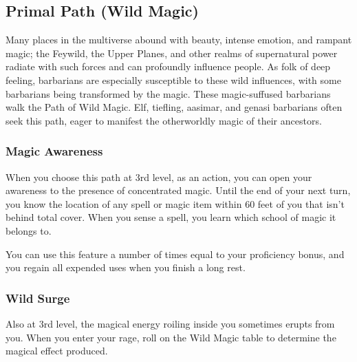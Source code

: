 {\subsection*{Primal Path (Wild Magic)}
Many places in the multiverse abound with beauty, intense emotion, and rampant magic; the Feywild, the Upper Planes, and other realms of supernatural power radiate with such forces and can profoundly influence people. As folk of deep feeling, barbarians are especially susceptible to these wild influences, with some barbarians being transformed by the magic. These magic-suffused barbarians walk the Path of Wild Magic. Elf, tiefling, aasimar, and genasi barbarians often seek this path, eager to manifest the otherworldly magic of their ancestors.
\subsubsection*{Magic Awareness}
When you choose this path at 3rd level, as an action, you can open your awareness to the presence of concentrated magic. Until the end of your next turn, you know the location of any spell or magic item within 60 feet of you that isn’t behind total cover. When you sense a spell, you learn which school of magic it belongs to.

You can use this feature a number of times equal to your proficiency bonus, and you regain all expended uses when you finish a long rest.
\subsubsection*{Wild Surge}
Also at 3rd level, the magical energy roiling inside you sometimes erupts from you. When you enter your rage, roll on the Wild Magic table to determine the magical effect produced.

}
